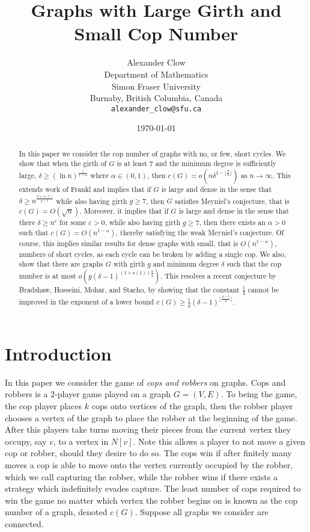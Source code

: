 \documentclass{amsart}
\title{Graphs with Large Girth and Small Cop Number}
\author{Alexander Clow\\
\footnotesize Department of Mathematics\\
\footnotesize Simon Fraser University\\
\footnotesize Burnaby, British Columbia, Canada\\
\footnotesize\tt alexander\_clow@sfu.ca\\}
\date{\today}
\theoremstyle{definition}
\def\epsilon{\varepsilon}
\begin{document}
\maketitle

\begin{abstract}
In this paper we consider the cop number of graphs with no, or few, short cycles. We show that when the girth of $G$ is at least $7$ and the minimum degree is sufficiently large, $\delta \geq (\ln{n})^{\frac{1}{1-\alpha}}$ where $\alpha \in (0,1)$, then $c(G) = o(n \delta^{1-\lfloor \frac{g}{4} \rfloor})$ as $n \rightarrow \infty$. This extends work of Frankl and implies that if $G$ is large and dense in the sense that $\delta \geq n^{\frac{2 + o(1)}{g-1}}$ while also having girth $g \geq 7$, then $G$ satisfies Meyniel's conjecture, that is $c(G) = O(\sqrt{n})$. Moreover, it implies that if $G$ is large and dense in the sense that there $\delta \geq n^{\epsilon}$ for some $\epsilon >0$, while also having girth $g \geq 7$, then there exists an $\alpha>0$ such that $c(G) = O(n^{1-\alpha})$, thereby satisfying the weak Meyniel's conjecture. Of course, this implies similar results for dense graphs with small, that is $O(n^{1-\alpha})$, numbers of short cycles, as each cycle can be broken by adding a single cop. We also, show that there are graphs $G$ with girth $g$ and minimum degree $\delta$ such that the cop number is at most $o(g (\delta-1)^{(1+o(1))\frac{g}{4}})$. This resolves a recent conjecture by Bradshaw, Hosseini, Mohar, and Stacho, by showing that the constant $\frac{1}{4}$ cannot be improved in the exponent of a lower bound $c(G) \geq \frac{1}{g} (\delta - 1)^{\lfloor \frac{g-1}{4}\rfloor}$.
\end{abstract}



\section{Introduction}

In this paper we consider the game of \emph{cops and robbers} on graphs. Cops and robbers is a 2-player game played on a graph $G = (V,E)$. To being the game, the cop player places $k$ cops onto vertices of the graph, then the robber player chooses a vertex of the graph to place the robber at the beginning of the game. After this players take turns moving their pieces from the current vertex they occupy, say $v$, to a vertex in $N[v]$. Note this allows a player to not move a given cop or robber, should they desire to do so. The cops win if after finitely many moves a cop is able to move onto the vertex currently occupied by the robber, which we call capturing the robber, while the robber wins if there exists a strategy which indefinitely evades capture. The least number of cops required to win the game no matter which vertex the robber begins on is known as the cop number of a graph, denoted $c(G)$. Suppose all graphs we consider are connected.
\end{document}
